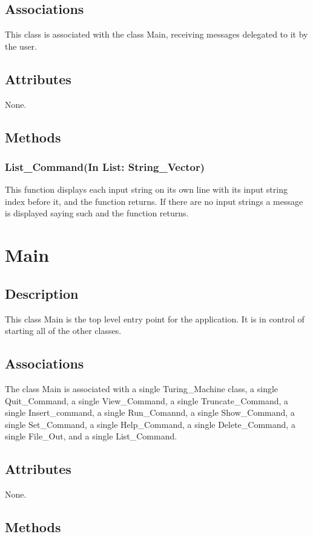 \documentclass{report}
\begin{document}
    \subsection{Associations} 
    This class is associated with the class Main, receiving messages delegated to it by the user.
    \subsection{Attributes}
    None.
    \subsection{Methods} 
    \subsubsection{List\_Command(In List: String\_Vector)}
    This function displays each input string on its own line with its input string index before it, and the function returns. If there are no input strings a message is displayed saying such and the function returns.
    




\section{Main}
	\subsection{Description}
    This class Main is the top level entry point for the application. It is in control of starting all of the other classes.
    \subsection{Associations} 
      The class Main is associated with a single Turing\_Machine class, a single Quit\_Command, a single View\_Command, a single Truncate\_Command, a single Insert\_command, a single Run\_Comannd, a single Show\_Command, a single Set\_Command, a single Help\_Command, a single Delete\_Command, a single File\_Out, and a single List\_Command.
    
    \subsection{Attributes}
    None.
    \subsection{Methods} 
\end{document}
